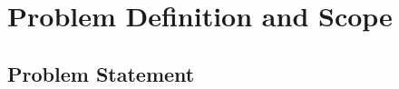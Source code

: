 \documentclass[11pt,fleqn]{book} %
\begin{document}
    
    
    
    
    
    
%    
%    



\chapter{Problem Definition and Scope}

\section{Problem Statement}
\end{document}
